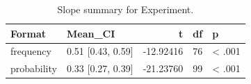 \begin{table}
\centering
\caption{Slope summary for Experiment.}
\centering
\fontsize{10}{12}\selectfont
\begin{tabular}[t]{llrrl}
\toprule
Format & Mean\_CI & t & df & p\\
\midrule
frequency & 0.51 [0.43, 0.59] & -12.92416 & 76 & < .001\\
probability & 0.33 [0.27, 0.39] & -21.23760 & 99 & < .001\\
\bottomrule
\end{tabular}
\end{table}
